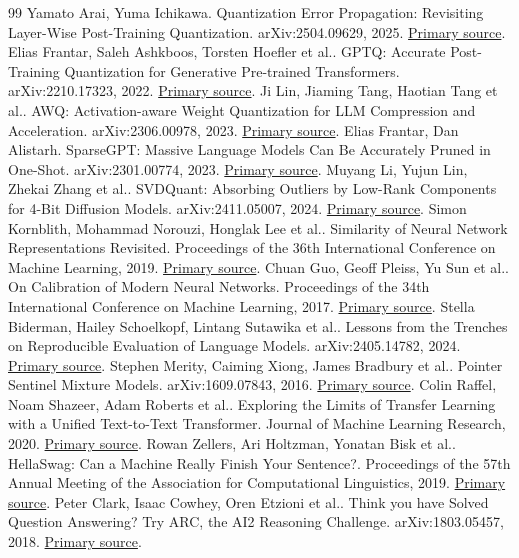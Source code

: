 \documentclass[10pt,a4paper,twocolumn]{article}
\begin{document}
\begin{thebibliography}{99}
 Yamato Arai, Yuma Ichikawa. Quantization Error Propagation: Revisiting Layer-Wise Post-Training Quantization. arXiv:2504.09629, 2025. \href{https://arxiv.org/abs/2504.09629}{Primary source}.
 Elias Frantar, Saleh Ashkboos, Torsten Hoefler et al.. GPTQ: Accurate Post-Training Quantization for Generative Pre-trained Transformers. arXiv:2210.17323, 2022. \href{https://arxiv.org/abs/2210.17323}{Primary source}.
 Ji Lin, Jiaming Tang, Haotian Tang et al.. AWQ: Activation-aware Weight Quantization for LLM Compression and Acceleration. arXiv:2306.00978, 2023. \href{https://arxiv.org/abs/2306.00978}{Primary source}.
 Elias Frantar, Dan Alistarh. SparseGPT: Massive Language Models Can Be Accurately Pruned in One-Shot. arXiv:2301.00774, 2023. \href{https://arxiv.org/abs/2301.00774}{Primary source}.
 Muyang Li, Yujun Lin, Zhekai Zhang et al.. SVDQuant: Absorbing Outliers by Low-Rank Components for 4-Bit Diffusion Models. arXiv:2411.05007, 2024. \href{https://arxiv.org/abs/2411.05007}{Primary source}.
 Simon Kornblith, Mohammad Norouzi, Honglak Lee et al.. Similarity of Neural Network Representations Revisited. Proceedings of the 36th International Conference on Machine Learning, 2019. \href{https://proceedings.mlr.press/v97/kornblith19a.html}{Primary source}.
 Chuan Guo, Geoff Pleiss, Yu Sun et al.. On Calibration of Modern Neural Networks. Proceedings of the 34th International Conference on Machine Learning, 2017. \href{https://proceedings.mlr.press/v70/guo17a.html}{Primary source}.
 Stella Biderman, Hailey Schoelkopf, Lintang Sutawika et al.. Lessons from the Trenches on Reproducible Evaluation of Language Models. arXiv:2405.14782, 2024. \href{https://arxiv.org/abs/2405.14782}{Primary source}.
 Stephen Merity, Caiming Xiong, James Bradbury et al.. Pointer Sentinel Mixture Models. arXiv:1609.07843, 2016. \href{https://arxiv.org/abs/1609.07843}{Primary source}.
 Colin Raffel, Noam Shazeer, Adam Roberts et al.. Exploring the Limits of Transfer Learning with a Unified Text-to-Text Transformer. Journal of Machine Learning Research, 2020. \href{https://jmlr.org/papers/v21/20-074.html}{Primary source}.
 Rowan Zellers, Ari Holtzman, Yonatan Bisk et al.. HellaSwag: Can a Machine Really Finish Your Sentence?. Proceedings of the 57th Annual Meeting of the Association for Computational Linguistics, 2019. \href{https://aclanthology.org/P19-1472/}{Primary source}.
 Peter Clark, Isaac Cowhey, Oren Etzioni et al.. Think you have Solved Question Answering? Try ARC, the AI2 Reasoning Challenge. arXiv:1803.05457, 2018. \href{https://arxiv.org/abs/1803.05457}{Primary source}.
\end{thebibliography}
\end{document}

